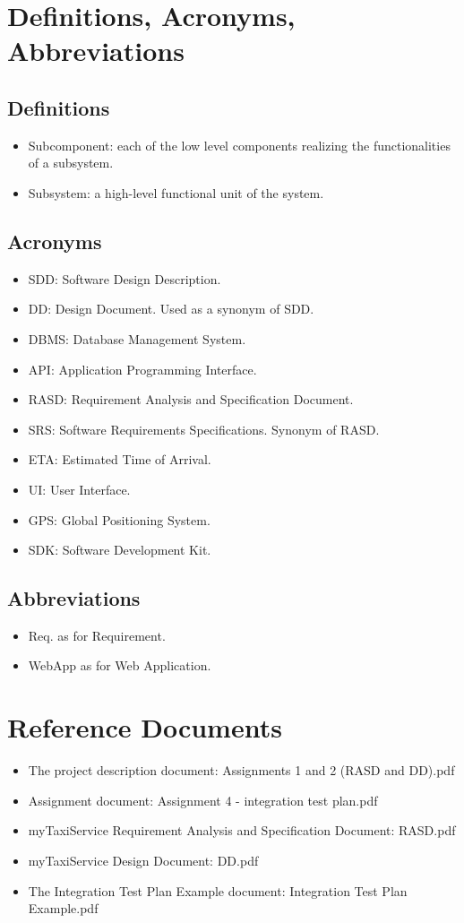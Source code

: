 \section{Definitions, Acronyms, Abbreviations}
\subsection{Definitions}
\begin{itemize}
	\item Subcomponent: each of the low level components realizing the functionalities of a subsystem.
	\item Subsystem: a high-level functional unit of the system.
\end{itemize}
\subsection{Acronyms}
\begin{itemize}
	\item SDD: Software Design Description.
	\item DD: Design Document. Used as a synonym of SDD.
	\item DBMS: Database Management System.
	\item API: Application Programming Interface.
	\item RASD: Requirement Analysis and Specification Document.
	\item SRS: Software Requirements Specifications. Synonym of RASD.
	\item ETA: Estimated Time of Arrival.
	\item UI: User Interface.
	\item GPS: Global Positioning System.
	\item SDK: Software Development Kit.
\end{itemize}
\subsection{Abbreviations}
\begin{itemize}
	\item Req. as for Requirement.
	\item WebApp as for Web Application.
\end{itemize}
\section{Reference Documents}
\begin{itemize}
	\item The project description document: Assignments 1 and 2 (RASD and DD).pdf
	\item Assignment document: Assignment 4 - integration test plan.pdf
	\item myTaxiService Requirement Analysis and Specification Document: RASD.pdf
	\item myTaxiService Design Document: DD.pdf
	\item The Integration Test Plan Example document: Integration Test Plan Example.pdf
\end{itemize} 